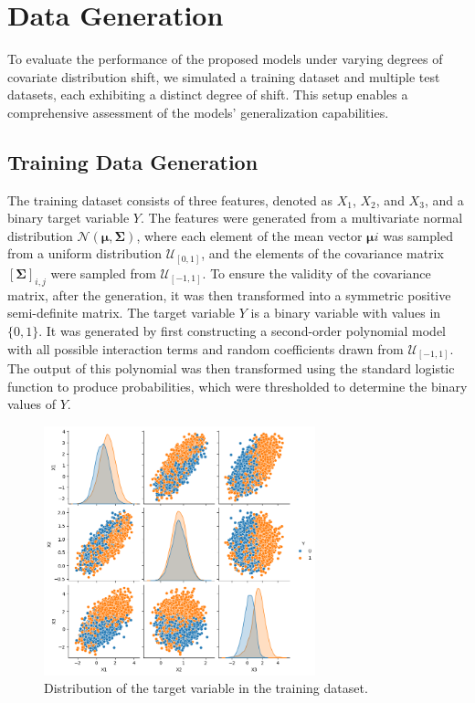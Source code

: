 \chapter{Data Generation}

To evaluate the performance of the proposed models under varying degrees of covariate distribution shift, we simulated a training dataset and multiple test datasets, each exhibiting a distinct degree of shift. This setup enables a comprehensive assessment of the models’ generalization capabilities.

\section{Training Data Generation}

The training dataset consists of three features, denoted as $X_1$, $X_2$, and $X_3$, and a binary target variable $Y$. The features were generated from a multivariate normal distribution $\mathcal{N}(\boldsymbol{\mu}, \boldsymbol{\Sigma})$, where each element of the mean vector $\boldsymbol{\mu}i$ was sampled from a uniform distribution $\mathcal{U}_{[0, 1]}$, and the elements of the covariance matrix $[\boldsymbol{\Sigma}]_{i,j}$ were sampled from $\mathcal{U}_{[-1, 1]}$. To ensure the validity of the covariance matrix, after the generation, it was then transformed into a symmetric positive semi-definite matrix.
The target variable $Y$ is a binary variable with values in $\{0, 1\}$. It was generated by first constructing a second-order polynomial model with all possible interaction terms and random coefficients drawn from $\mathcal{U}_{[-1, 1]}$. The output of this polynomial was then transformed using the standard logistic function to produce probabilities, which were thresholded to determine the binary values of $Y$.

\begin{figure}
    \centering
    \includegraphics[width=0.7\textwidth]{assets/label_dist_train.png}
    \caption{Distribution of the target variable in the training dataset.}
    \label{fig:label_dist_train}
\end{figure}


